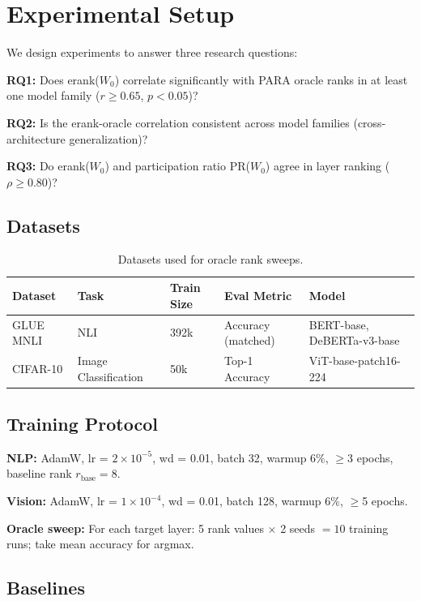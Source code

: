\section{Experimental Setup}
\label{sec:experiments}

We design experiments to answer three research questions:

\textbf{RQ1:} Does erank($W_0$) correlate significantly with PARA oracle ranks in at least one model family ($r \geq 0.65$, $p < 0.05$)?

\textbf{RQ2:} Is the erank-oracle correlation consistent across model families (cross-architecture generalization)?

\textbf{RQ3:} Do erank($W_0$) and participation ratio PR($W_0$) agree in layer ranking ($\rho \geq 0.80$)?

\subsection{Datasets}

\begin{table}[h]
\centering
\caption{Datasets used for oracle rank sweeps.}
\label{tab:datasets}
\begin{tabular}{lllll}
\toprule
Dataset & Task & Train Size & Eval Metric & Model \\
\midrule
GLUE MNLI & NLI & 392k & Accuracy (matched) & BERT-base, DeBERTa-v3-base \\
CIFAR-10 & Image Classification & 50k & Top-1 Accuracy & ViT-base-patch16-224 \\
\bottomrule
\end{tabular}
\end{table}

\subsection{Training Protocol}

\textbf{NLP:} AdamW, lr = $2\times10^{-5}$, wd = 0.01, batch 32, warmup 6\%, $\geq$3 epochs, baseline rank $r_{\text{base}} = 8$.

\textbf{Vision:} AdamW, lr = $1\times10^{-4}$, wd = 0.01, batch 128, warmup 6\%, $\geq$5 epochs.

\textbf{Oracle sweep:} For each target layer: 5 rank values $\times$ 2 seeds $= 10$ training runs; take mean accuracy for argmax.

\subsection{Baselines}

